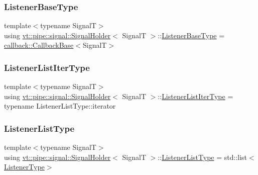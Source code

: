 \subsubsection{\texorpdfstring{Listener\+Base\+Type}{ListenerBaseType}}
{\footnotesize\ttfamily template$<$typename SignalT$>$ \\
using \hyperlink{structvt_1_1pipe_1_1signal_1_1_signal_holder}{vt\+::pipe\+::signal\+::\+Signal\+Holder}$<$ SignalT $>$\+::\hyperlink{structvt_1_1pipe_1_1signal_1_1_signal_holder_a84b564235f6d400782769c94a75d6622}{Listener\+Base\+Type} =  \hyperlink{structvt_1_1pipe_1_1callback_1_1_callback_base}{callback\+::\+Callback\+Base}$<$SignalT$>$}

\mbox{\label{structvt_1_1pipe_1_1signal_1_1_signal_holder_af0d3ccf4a8700979f414a0485cf41df5}} 
\subsubsection{\texorpdfstring{Listener\+List\+Iter\+Type}{ListenerListIterType}}
{\footnotesize\ttfamily template$<$typename SignalT$>$ \\
using \hyperlink{structvt_1_1pipe_1_1signal_1_1_signal_holder}{vt\+::pipe\+::signal\+::\+Signal\+Holder}$<$ SignalT $>$\+::\hyperlink{structvt_1_1pipe_1_1signal_1_1_signal_holder_af0d3ccf4a8700979f414a0485cf41df5}{Listener\+List\+Iter\+Type} =  typename Listener\+List\+Type\+::iterator}

\mbox{\label{structvt_1_1pipe_1_1signal_1_1_signal_holder_ae37fd15e6a901de2f90620780e936f6e}} 
\subsubsection{\texorpdfstring{Listener\+List\+Type}{ListenerListType}}
{\footnotesize\ttfamily template$<$typename SignalT$>$ \\
using \hyperlink{structvt_1_1pipe_1_1signal_1_1_signal_holder}{vt\+::pipe\+::signal\+::\+Signal\+Holder}$<$ SignalT $>$\+::\hyperlink{structvt_1_1pipe_1_1signal_1_1_signal_holder_ae37fd15e6a901de2f90620780e936f6e}{Listener\+List\+Type} =  std\+::list$<$\hyperlink{structvt_1_1pipe_1_1signal_1_1_signal_holder_a23af418129e6e8ecb4ee9621e6fd6f90}{Listener\+Type}$>$}


